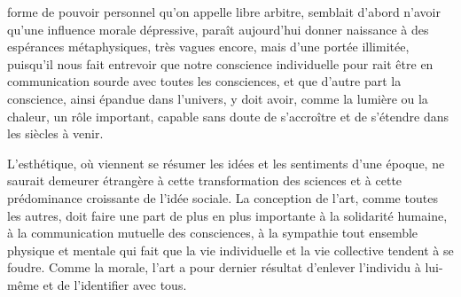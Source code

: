 \documentclass[french,twoside]{book} %
\begin{document}
forme de pouvoir personnel qu’on appelle libre arbitre, semblait d’abord n’avoir qu’une influence morale dépressive, paraît aujourd’hui donner naissance à des espérances métaphysiques, très vagues encore, mais d’une portée illimitée, puisqu’il nous fait entrevoir que notre conscience individuelle pour rait être en communication sourde avec toutes les consciences, et que d’autre part la conscience, ainsi épandue dans l’univers, y doit avoir, comme la lumière ou la chaleur, un rôle important, capable sans doute de s’accroître et de s’étendre dans les siècles à venir.\par
L’esthétique, où viennent se résumer les idées et les sentiments d’une époque, ne saurait demeurer étrangère à cette transformation des sciences et à cette prédominance croissante de l’idée sociale. La conception de l’art, comme toutes les autres, doit faire une part de plus en plus importante à la solidarité humaine, à la communication mutuelle des consciences, à la sympathie tout ensemble physique et mentale qui fait que la vie individuelle et la vie collective tendent à se foudre. Comme la morale, l’art a pour dernier résultat d’enlever l’individu à lui-même et de l’identifier avec tous.\par
\end{document}
